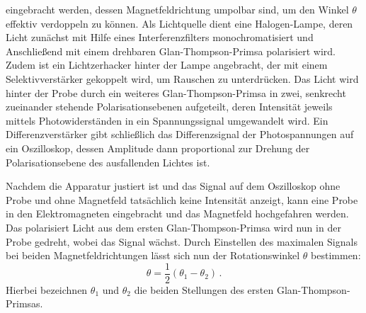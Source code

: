 eingebracht werden,
dessen Magnetfeldrichtung umpolbar sind, um den Winkel $\theta$
effektiv verdoppeln zu können.
Als Lichtquelle dient eine Halogen-Lampe, deren Licht zunächst mit Hilfe eines
Interferenzfilters monochromatisiert und Anschließend mit einem
drehbaren Glan-Thompson-Primsa polarisiert wird.
Zudem ist ein Lichtzerhacker hinter der Lampe angebracht, der mit einem
Selektivverstärker gekoppelt wird, um Rauschen zu unterdrücken.
Das Licht wird hinter der Probe durch ein weiteres Glan-Thompson-Primsa in
zwei, senkrecht zueinander stehende Polarisationsebenen aufgeteilt, deren
Intensität jeweils mittels Photowiderständen in ein Spannungssignal
umgewandelt wird.
Ein Differenzverstärker gibt schließlich das Differenzsignal der
Photospannungen auf ein Oszilloskop, dessen Amplitude dann proportional zur
Drehung der Polarisationsebene des ausfallenden Lichtes ist.

Nachdem die Apparatur justiert ist und das Signal auf dem Oszilloskop
ohne Probe und ohne Magnetfeld tatsächlich keine Intensität anzeigt,
kann eine Probe in den Elektromagneten eingebracht und das Magnetfeld
hochgefahren werden.
Das polarisiert Licht aus dem ersten Glan-Thompson-Primsa wird nun in der
Probe gedreht, wobei das Signal wächst.
Durch Einstellen des maximalen Signals bei beiden Magnetfeldrichtungen
lässt sich nun der Rotationswinkel $\theta$ bestimmen:
\begin{equation}
    \label{eqn:theta_messung}
    \theta = \frac{1}{2}\left(\theta_1-\theta_2\right)\,.
\end{equation}
Hierbei bezeichnen $\theta_1$ und $\theta_2$ die beiden Stellungen des ersten
Glan-Thompson-Primsas.

